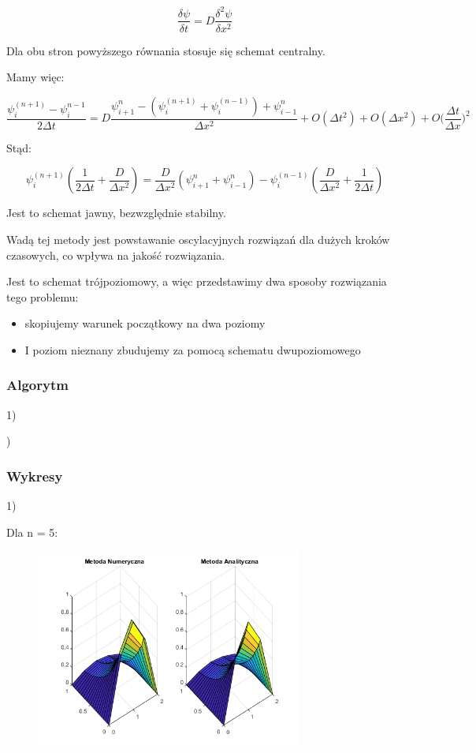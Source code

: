 $$\dfrac{\delta \psi}{\delta t} = D\dfrac{\delta^2 \psi}{\delta x^2}$$

Dla obu stron powyższego równania stosuje się schemat centralny.

Mamy więc:

$$\dfrac{\psi^{(n+1)}_{i}-\psi^{n-1}_{i}}{2\Delta t}=D\dfrac{\psi^{n}_{i+1}- \left( \psi^{(n+1)}_{i} + \psi^{(n-1)}_{i} \right)+\psi^n_{i-1}}{\Delta x^2} + O(\Delta t^2) + O(\Delta x^2) +  O\Big(\dfrac{\Delta t}{\Delta x}\Big)^2$$

Stąd:

$$\psi^{(n+1)}_{i} \left(\dfrac{1}{2 \Delta t} + \dfrac{D}{\Delta x^2}\right)= \dfrac{D}{\Delta x^2} \left( \psi^{n}_{i+1} + \psi^{n}_{i-1} \right) - \psi^{(n-1)}_{i} \left( \dfrac{D}{\Delta x^2} + \dfrac{1}{2\Delta t} \right) $$

Jest to schemat jawny, bezwzględnie stabilny. 

Wadą tej metody jest powstawanie oscylacyjnych rozwiązań dla dużych kroków czasowych, co wpływa na jakość rozwiązania.

Jest to schemat trójpoziomowy, a więc przedstawimy dwa sposoby rozwiązania tego problemu:
\begin{itemize}
	\item skopiujemy warunek początkowy na dwa poziomy
	\item I poziom nieznany zbudujemy za pomocą schematu dwupoziomowego
\end{itemize}

\newpage
\subsubsection{Algorytm}
1)

)

\newpage
\subsubsection{Wykresy}
1)

Dla n = 5:

\begin{figure}[!ht]
	\begin{center}
		\includegraphics[width=0.78\textwidth]{Lab7/charts/df/5.png}
	\end{center}
\end{figure}

